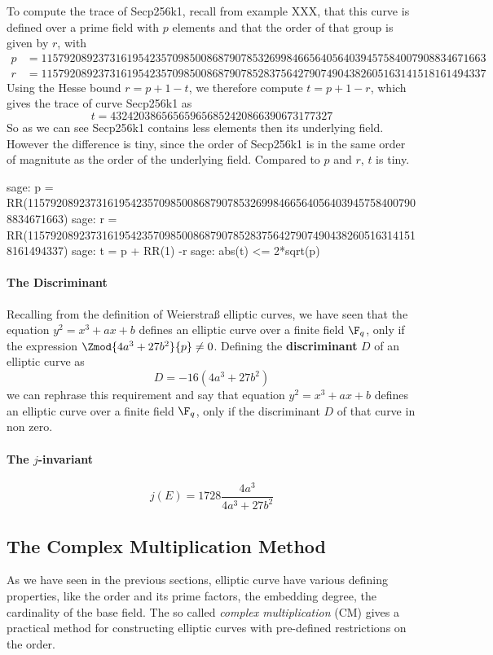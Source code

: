 \begin{example}To compute the trace of Secp256k1, recall from example XXX, that this curve is defined over a prime field with $p$ elements and that the order of that group is given by $r$, with  
\begin{align*}
p &= \scriptstyle 115792089237316195423570985008687907853269984665640564039457584007908834671663\\
r &= \scriptstyle 115792089237316195423570985008687907852837564279074904382605163141518161494337
\end{align*}
Using the Hesse bound $r = p + 1 -t$, we therefore compute $t= p+1 -r$, which gives the trace of curve Secp256k1 as 
$$
t = \scriptstyle 432420386565659656852420866390673177327
$$
So as we can see Secp256k1 contains less elements then its underlying field. However  the difference is tiny, since the order of Secp256k1 is in the same order of magnitute as the order of the underlying field. Compared to $p$ and $r$, $t$ is tiny.
\begin{sagecommandline}
sage: p = RR(115792089237316195423570985008687907853269984665640564039457584007908834671663)
sage: r = RR(115792089237316195423570985008687907852837564279074904382605163141518161494337)
sage: t = p + RR(1) -r
sage: abs(t) <= 2*sqrt(p)
\end{sagecommandline}
\end{example}
\paragraph{The Discriminant} Recalling from the definition of Weierstraß elliptic curves, we have seen that the equation $y^2 = x^3 + ax +b$ defines an elliptic curve over a finite field $\F_q$, only if the expression $\Zmod{4a^3+27b^2}{p}\neq 0$. Defining the \textbf{discriminant} $D$ of an elliptic curve as 
\begin{equation}
D = -16(4a^3 + 27 b^2)
\end{equation}
we can rephrase this requirement and say that equation $y^2 = x^3 + ax +b$ defines an elliptic curve over a finite field $\F_q$, only if the discriminant $D$ of that curve in non zero. 
\paragraph{The $j$-invariant} 
\begin{equation}
j(E) = 1728\frac{4a^3}{4a^3+ 27b^2}
\end{equation}
\subsection{The Complex Multiplication Method}
As we have seen in the previous sections, elliptic curve have various defining properties, like the order and its prime factors, the embedding degree, the cardinality of the base field. The so called \textit{complex multiplication} (CM) gives a practical method for constructing elliptic curves with pre-defined restrictions on the order.

